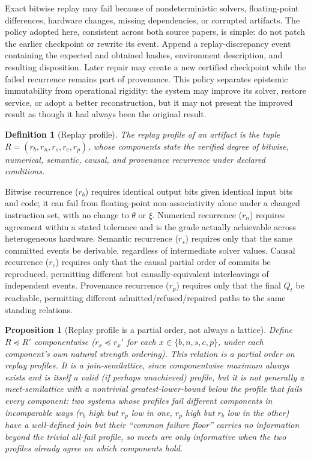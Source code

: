 \documentclass[11pt]{article}
\newtheorem{definition}{Definition}
\newtheorem{proposition}{Proposition}
\begin{document}
Exact bitwise replay may fail because of nondeterministic solvers, floating-point differences, hardware changes, missing dependencies, or corrupted artifacts. The policy adopted here, consistent across both source papers, is simple: do not patch the earlier checkpoint or rewrite its event. Append a replay-discrepancy event containing the expected and obtained hashes, environment description, and resulting disposition. Later repair may create a new certified checkpoint while the failed recurrence remains part of provenance. This policy separates epistemic immutability from operational rigidity: the system may improve its solver, restore service, or adopt a better reconstruction, but it may not present the improved result as though it had always been the original result.

\begin{definition}[Replay profile]
\label{def:replay-profile}
The replay profile of an artifact is the tuple $R = (r_b, r_n, r_s, r_c, r_p)$, whose components state the verified degree of bitwise, numerical, semantic, causal, and provenance recurrence under declared conditions.
\end{definition}

Bitwise recurrence ($r_b$) requires identical output bits given identical input bits and code; it can fail from floating-point non-associativity alone under a changed instruction set, with no change to $\theta$ or $\xi$. Numerical recurrence ($r_n$) requires agreement within a stated tolerance and is the grade actually achievable across heterogeneous hardware. Semantic recurrence ($r_s$) requires only that the same committed events be derivable, regardless of intermediate solver values. Causal recurrence ($r_c$) requires only that the causal partial order of commits be reproduced, permitting different but causally-equivalent interleavings of independent events. Provenance recurrence ($r_p$) requires only that the final $Q_t$ be reachable, permitting different admitted/refused/repaired paths to the same standing relations.

\begin{proposition}[Replay profile is a partial order, not always a lattice]
\label{prop:replay-lattice}
Define $R \preceq R'$ componentwise ($r_x \preceq r_x'$ for each $x \in \{b,n,s,c,p\}$, under each component's own natural strength ordering). This relation is a partial order on replay profiles. It is a join-semilattice, since componentwise maximum always exists and is itself a valid (if perhaps unachieved) profile, but it is not generally a meet-semilattice with a nontrivial greatest-lower-bound below the profile that fails every component: two systems whose profiles fail different components in incomparable ways ($r_b$ high but $r_p$ low in one, $r_p$ high but $r_b$ low in the other) have a well-defined join but their ``common failure floor'' carries no information beyond the trivial all-fail profile, so meets are only informative when the two profiles already agree on which components hold.
\end{proposition}
\end{document}
